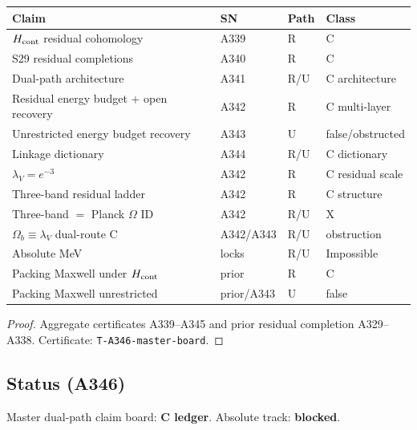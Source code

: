 \begin{theorem}
\label{thm:A346}
\begin{center}
\begin{tabular}{@{}p{4.0cm}p{1.6cm}p{1.4cm}p{4.2cm}@{}}
\toprule
Claim & SN & Path & Class \\
\midrule
$H_{\rm cont}$ residual cohomology & A339 & R & C \\
S29 residual completions & A340 & R & C \\
Dual-path architecture & A341 & R/U & C architecture \\
Residual energy budget + open recovery & A342 & R & C multi-layer \\
Unrestricted energy budget recovery & A343 & U & false/obstructed \\
Linkage dictionary & A344 & R/U & C dictionary \\
$\lambda_V=e^{-3}$ & A342 & R & C residual scale \\
Three-band residual ladder & A342 & R & C structure \\
Three-band $=$ Planck $\Omega$ ID & A342 & R/U & X \\
$\Omega_b\equiv\lambda_V$ dual-route C & A342/A343 & R/U & obstruction \\
Absolute MeV & locks & R/U & Impossible \\
Packing Maxwell under $H_{\rm cont}$ & prior & R & C \\
Packing Maxwell unrestricted & prior/A343 & U & false \\
\bottomrule
\end{tabular}
\end{center}
\end{theorem}

\begin{proof}
Aggregate certificates A339--A345 and prior residual completion A329--A338. Certificate: \texttt{T-A346-master-board}.
\end{proof}

\subsection*{Status (A346)}
Master dual-path claim board: \textbf{C ledger}. Absolute track: \textbf{blocked}.
